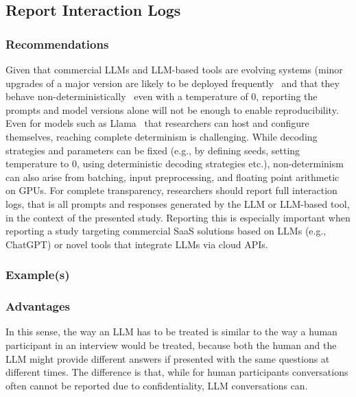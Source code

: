 



\subsection{Report Interaction Logs}

\subsubsection{Recommendations}

Given that commercial LLMs and LLM-based tools are evolving systems (minor upgrades of a major version are likely to be deployed frequently~\cite{DBLP:journals/corr/abs-2307-09009} and that they behave non-deterministically~\cite{Chann2023} even with a temperature of 0, reporting the prompts and model versions alone will not be enough to enable reproducibility.
Even for models such as Llama~\cite{Meta2025} that researchers can host and configure themselves, reaching complete determinism is challenging.
While decoding strategies and parameters can be fixed (e.g., by defining seeds, setting temperature to 0, using deterministic decoding strategies etc.), non-determinism can also arise from batching, input preprocessing, and floating point arithmetic on GPUs.
For complete transparency, researchers should report full interaction logs, that is all prompts and responses generated by the LLM or LLM-based tool, in the context of the presented study.
Reporting this is especially important when reporting a study targeting commercial SaaS solutions based on LLMs (e.g., ChatGPT) or novel tools that integrate LLMs via cloud APIs.


\subsubsection{Example(s)}



\subsubsection{Advantages}

In this sense, the way an LLM has to be treated is similar to the way a human participant in an interview would be treated, because both the human and the LLM might provide different answers if presented with the same questions at different times.
The difference is that, while for human participants conversations often cannot be reported due to confidentiality, LLM conversations can.


